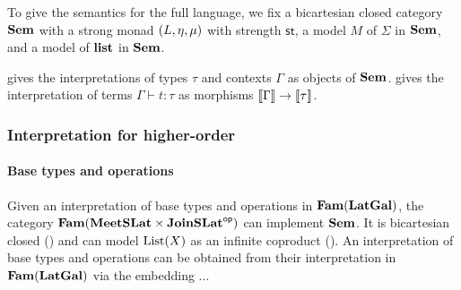 To give the semantics for the full language, we fix a bicartesian closed category $\mathbf{Sem}$ with a strong monad
$(L, \eta, \mu)$ with strength $\mathsf{st}$, a model $M$ of $\Sigma$ in $\mathbf{Sem}$, and a model of $\mathbf{list}$
in $\mathbf{Sem}$.

 gives the interpretations of types $\tau$ and contexts $\Gamma$ as objects of $\mathbf{Sem}$.
 gives the interpretation of terms $\Gamma \vdash t: \tau$ as morphisms $\llbracket \Gamma \rrbracket
\to \llbracket \tau \rrbracket$.

\subsubsection{Interpretation for higher-order \GPS}

\paragraph{Base types and operations}
Given an interpretation of base types and operations in $\mathbf{Fam}(\mathbf{LatGal})$, the category $\mathbf{Fam}(\mathbf{MeetSLat} \times
\mathbf{JoinSLat}^{\mathsf{op}})$ can implement $\mathbf{Sem}$. It is bicartesian closed () and can model
$\mathrm{List}(X)$ as an infinite coproduct (). An interpretation
of base types and operations can be obtained from their interpretation in $\mathbf{Fam}(\mathbf{LatGal})$ via the embedding
...
